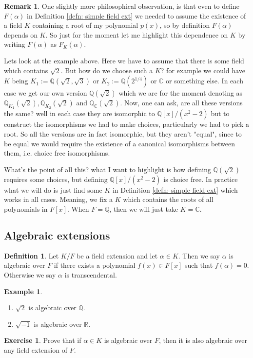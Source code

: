 \documentclass[11pt,a4paper]{report}
\theoremstyle{plain}
\theoremstyle{definition}
\newtheorem{defn}[subsection]{Definition}
\newtheorem{exmp}[subsection]{Example}
\theoremstyle{definition}
\newtheorem{rmrk}[subsection]{Remark}
\newtheorem{question}[subsection]{Exercise}
\newcommand{\Q}{\mathbb{Q}}
\newcommand{\RR}{\mathbb{R}}
\def\CC{\mathbb{C}}
\def\QQ{\mathbb{Q}}
\def \a{\alpha}
\begin{document}
	\begin{rmrk}
		One slightly more philosophical observation, is that even to define $F(\a)$ in Definition \ref{defn: simple field ext} we needed to assume the existence of a field $K$ containing a root of my polynomial $p(x)$, so by definition $F(\a)$ depends on $K$. So just for the moment let me highlight this dependence on $K$ by writing $F(\a)$ as $F_{K}(\a)$.
		
		Lets look at the example above. Here we have to assume that there is some field which contains $\sqrt{2}$. But how do we choose such a $K$? for example we could have $K$ being $K_1:=\Q(\sqrt{2},\sqrt{3})$ or $K_2:=\QQ(2^{1/4})$ or $\CC$ or something else. In each case we get our own version $\QQ(\sqrt{2})$ which we are for the moment denoting as $\QQ_{K_1}(\sqrt{2}),\QQ_{K_2}(\sqrt{2})$ and $\QQ_{\CC}(\sqrt{2})$. Now, one can ask, are all these versions the same? well in each case they are isomorphic to $\QQ[x]/(x^2-2)$ but to construct the isomorphisms we had to make choices, particularly we had to pick a root. So all the versions are in fact isomorphic, but they aren't "equal", since to be equal we would require the existence of a canonical isomorphisms between them, i.e.  choice free isomorphisms.
		
		What's the point of all this? what I want to highlight is how defining $\QQ(\sqrt{2})$ requires some choices, but defining $\QQ[x]/(x^2-2)$ is choice free.  In practice what we will do is just find some $K$ in Definition \ref{defn: simple field ext} which works in all cases. Meaning, we fix a $K$ which contains the roots of all polynomials in $F[x]$. When $F=\QQ$, then we will just take $K=\CC$. 
		
		
		
	\end{rmrk}
	
	
	\subsection{Algebraic extensions}
	
	\begin{defn}\label{defn: alg elts}
		Let $K/F$ be a field extension and let $\a \in K$. Then we say $\a$ is algebraic over $F$ if there exists a polynomial $f(x) \in F[x]$ such that $f(\a)=0$. Otherwise we say $\a$ is transcendental. 		
	\end{defn}
	
	\begin{exmp}
		\begin{enumerate}
			\item $\sqrt{2}$ is algebraic over $\QQ$.
			\item $\sqrt{-1}$ is algebraic over $\RR$.
		\end{enumerate}
	\end{exmp}
	\begin{question}
		Prove that if $\a \in K$ is algebraic over $F$, then it is also algebraic over any field extension of $F$. 
	\end{question}
	
\end{document}
